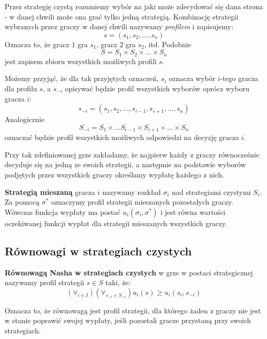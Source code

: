 \documentclass[polish]{standalone}
\begin{document}
Przez strategię czystą rozumiemy wybór na jaki może zdecydować się dana strona - w danej chwili może ona grać tylko
jedną strategią. Kombinację strategii wybranych przez graczy w danej chwili nazywamy \textit{profilem} i zapisujemy:
$$s = (s_1, s_2, ..., s_n)$$
Oznacza to, że gracz $1$ gra $s_1$, gracz $2$ gra $s_2$, itd. Podobnie
$$S = S_1 \times S_2 \times ... \times S_n$$
jest zapisem zbioru wszystkich możliwych profili $s$.

Możemy przyjąć, że dla tak przyjętych oznaczeń, $s_i$ oznacza wybór $i$-tego gracza dla profilu $s$, a $s_{-i}$ opisywać
będzie profil wszystkich wyborów oprócz wyboru gracza $i$:
$$s_{-i} = (s_1, s_2, ..., s_{i-1}, s_{s+1}, ..., s_n)$$
Analogicznie
$$S_{-i} = S_1 \times ... S_{i-1} \times S_{i+1} \times ... \times S_n$$
oznaczać będzie profil wszystkich możliwych odpowiedzi na decyzję gracza $i$.

Przy tak zdefiniowanej grze zakładamy, że najpierw każdy z graczy równocześnie decyduje się na jedną ze swoich strategii, a następnie na podstawie wyborów podjętych przez wszystkich graczy określamy wypłatę każdego z nich.

\begin{definition}
\textbf{Strategią mieszaną} gracza $i$ nazywamy rozkład $\sigma_i$ nad strategiami czystymi
$S_i$. Za pomocą $\sigma^{*}$ oznaczymy profil strategii mieszanych pozostałych graczy. Wówczas funkcja wypłaty ma
postać $u_i(\sigma_i, \sigma^{*})$ i jest równa wartości oczekiwanej funkcji wypłat dla strategii mieszanych wszystkich
graczy.
\cite[str.~5]{FT-GT}
\end{definition}

\subsection{Równowagi w strategiach czystych}

\begin{definition}
\textbf{Równowagą Nasha w strategiach czystych} w grze w postaci strategicznej nazywamy profil
strategii $s \in S$ taki, że:
$$(\forall_{i \in I}) (\forall_{s_{-i} \in S_{-i}}) u_i(s) \geq u_i(s_i, s_{-i})$$
\cite[str.~11]{FT-GT}
\end{definition}

Oznacza to, że równowagą jest profil strategii, dla którego żaden z graczy nie jest w stanie poprawić swojej wypłaty,
jeśli pozostali gracze przystaną przy swoich strategiach.
\end{document}
